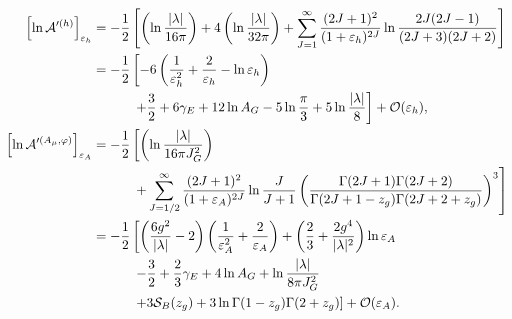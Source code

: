\documentclass[12pt]{article}
\begin{document}
\begin{align}
  \left[
    \ln\mathcal A'^{(h)}
  \right]_{\varepsilon_{h}}
  & = -\frac{1}{2}
  \left[
    \left(
      \ln\frac{|\lambda|}{16\pi}
    \right)+4
    \left(
      \ln\frac{|\lambda|}{32\pi}
    \right)+\sum_{J=1}^{\infty}\frac{(2J+1)^2}{(1+\varepsilon_{h})^{2J}}
    \ln\frac{2J(2J-1)}{(2J+3)(2J+2)}
  \right]
  \nonumber \\
  & = -\frac{1}{2}
  \left[
    -6
    \left(
      \frac{1}{\varepsilon_{h}^2}+\frac{2}{\varepsilon_{h}}-\ln\varepsilon_{h}
    \right)\right.
  \nonumber \\
  & \left.\hspace{7ex}+\frac{3}{2}+6\gamma_E+12\ln A_G-5
    \ln\frac{\pi}{3}+5\ln\frac{|\lambda|}{8}
  \right]+\mathcal O(\varepsilon_{h}),
  \\
  \left[
    \ln\mathcal A'^{(A_\mu,\varphi)}
  \right]_{\varepsilon_{A}}
  & = -\frac{1}{2}
  \left[
    \left(
      \ln\frac{|\lambda|}{16\pi J_G^2}
    \right)\right.
  \nonumber \\
  & \left.\hspace{7ex}+\sum_{J=1/2}^{\infty}\frac{(2J+1)^2}{(1+\varepsilon_{A})^{2J}}
    \ln\frac{J}{J+1}
    \left(
      \frac{\Gamma(2J+1)\Gamma(2J+2)}{\Gamma(2J+1-z_g)\Gamma(2J+2+z_g)}
    \right)^3\right]
  \nonumber \\
  & = -\frac{1}{2}
  \left[
    \left(
      \frac{6g^2}{|\lambda|}-2
    \right)
    \left(
      \frac{1}{\varepsilon_{A}^2}+\frac{2}{\varepsilon_{A}}
    \right)+
    \left(
      \frac{2}{3}+\frac{2g^4}{|\lambda|^2}
    \right)\ln\varepsilon_{A}\right.
  \nonumber \\
  & \left.\hspace{7ex}-\frac{3}{2}+\frac{2}{3}\gamma_E+4\ln A_G+
    \ln\frac{|\lambda|}{8\pi J_G^2}\right.
  \nonumber \\
  & \left.\hspace{7ex}+3\mathcal S_B(z_g)+3\ln\Gamma(1-z_g)\Gamma(2+z_g)
  \right] +\mathcal O(\varepsilon_{A}).
\end{align}

\end{document}
